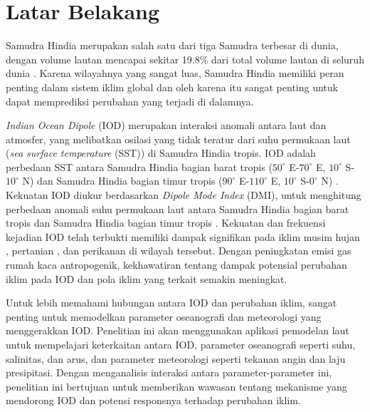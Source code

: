 \vspace{1.5pc}
\section[Latar Belakang]{Latar Belakang}
\begin{spacing}{1.5}
	Samudra Hindia merupakan salah satu dari tiga Samudra terbesar di dunia, dengan volume lautan mencapai sekitar 19.8\% dari total volume lautan di seluruh dunia \cite{Eakins2010}. Karena wilayahnya yang sangat luas, Samudra Hindia memiliki peran penting dalam sistem iklim global dan oleh karena itu sangat penting untuk dapat memprediksi perubahan yang terjadi di dalamnya.
	
	\textit{Indian Ocean Dipole} (IOD) merupakan interaksi anomali antara laut dan atmosfer, yang melibatkan osilasi yang tidak teratur dari suhu permukaan laut (\textit{sea surface temperature} (SST)) di Samudra Hindia tropis. IOD adalah perbedaan SST antara Samudra Hindia bagian barat tropis ($50^\circ$ E-$70^\circ$ E, $10^\circ$ S-$10^\circ$ N) dan Samudra Hindia bagian timur tropis ($90^\circ$ E-$110^\circ$ E, $10^\circ$ S-$0^\circ$ N) \cite{Shunmugapandi2022,Thushara2020,Sattar2019}. Kekuatan IOD diukur berdasarkan \textit{Dipole Mode Index} (DMI), untuk menghitung perbedaan anomali suhu permukaan laut antara Samudra Hindia bagian barat tropis dan Samudra Hindia bagian timur tropis \cite{Saji1999}. Kekuatan dan frekuensi kejadian IOD telah terbukti memiliki dampak signifikan pada iklim musim hujan \cite{Qiu2014}, pertanian \cite{Zhang2016}, dan perikanan \cite{Lan2013} di wilayah tersebut. Dengan peningkatan emisi gas rumah kaca antropogenik, kekhawatiran tentang dampak potensial perubahan iklim pada IOD dan pola iklim yang terkait semakin meningkat.
	
	Untuk lebih memahami hubungan antara IOD dan perubahan iklim, sangat penting untuk memodelkan parameter oseanografi dan meteorologi yang menggerakkan IOD. Penelitian ini akan menggunakan aplikasi pemodelan laut untuk mempelajari keterkaitan antara IOD, parameter oseanografi seperti suhu, salinitas, dan arus, dan parameter meteorologi seperti tekanan angin dan laju presipitasi. Dengan menganalisis interaksi antara parameter-parameter ini, penelitian ini bertujuan untuk memberikan wawasan tentang mekanisme yang mendorong IOD dan potensi responsnya terhadap perubahan iklim.
	

\end{spacing}
